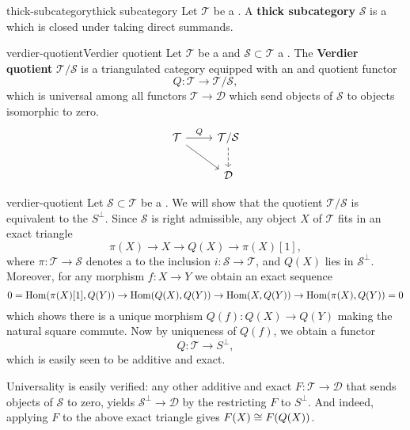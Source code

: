 \begin{topic}{thick-subcategory}{thick subcategory}
    Let $\mathcal{T}$ be a . A \textbf{thick subcategory} $\mathcal{S}$ is a   which is closed under taking direct summands.
\end{topic}

\begin{topic}{verdier-quotient}{Verdier quotient}
    Let $\mathcal{T}$ be a  and $\mathcal{S} \subset \mathcal{T}$ a . The \textbf{Verdier quotient} $\mathcal{T}/\mathcal{S}$ is a triangulated category equipped with an  and  quotient functor
    \[ Q : \mathcal{T} \to \mathcal{T}/\mathcal{S} , \]
    which is universal among all functors $\mathcal{T} \to \mathcal{D}$ which send objects of $\mathcal{S}$ to objects isomorphic to zero.
    \[ \begin{tikzcd} \mathcal{T} \arrow{r}{Q} \arrow{rd} & \mathcal{T} / \mathcal{S} \arrow[dashed]{d} \\ & \mathcal{D} \end{tikzcd} \]
\end{topic}

\begin{example}{verdier-quotient}
    Let $\mathcal{S} \subset \mathcal{T}$ be a . We will show that the quotient $\mathcal{T}/\mathcal{S}$ is equivalent to the  $S^\perp$. Since $\mathcal{S}$ is right admissible, any object $X$ of $\mathcal{T}$ fits in an exact triangle
    \[ \pi(X) \to X \to Q(X) \to \pi(X)[1] , \]
    where $\pi : \mathcal{T} \to \mathcal{S}$ denotes a  to the inclusion $i : \mathcal{S} \to \mathcal{T}$, and $Q(X)$ lies in $\mathcal{S}^\perp$. Moreover, for any morphism $f : X \to Y$ we obtain an exact sequence
    \[ 0 = \operatorname{Hom}(\pi(X)[1], Q(Y)) \to \operatorname{Hom}(Q(X), Q(Y)) \to \operatorname{Hom}(X, Q(Y)) \to \operatorname{Hom}(\pi(X), Q(Y)) = 0 \]
    which shows there is a unique morphism $Q(f) : Q(X) \to Q(Y)$ making the natural square commute.
    Now by uniqueness of $Q(f)$, we obtain a functor
    \[ Q : \mathcal{T} \to S^\perp , \]
    which is easily seen to be additive and exact.
    
    Universality is easily verified: any other additive and exact $F : \mathcal{T} \to \mathcal{D}$ that sends objects of $\mathcal{S}$ to zero, yields $\mathcal{S}^\perp \to \mathcal{D}$ by the restricting $F$ to $S^\perp$. And indeed, applying $F$ to the above exact triangle gives $F(X) \cong F(Q(X))$.
\end{example}

